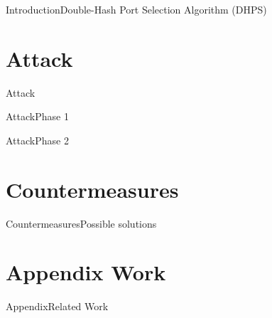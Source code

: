 \documentclass[aspectratio=169, hyperref={colorlinks=true, allcolors=SecondaryColor}, c]{beamer}
\begin{document}
\begin{frame}[fragile]{Introduction}{Double-Hash Port Selection Algorithm (DHPS)}
	\begin{center}
		\begin{adjustbox}{scale=0.7}
			
		\end{adjustbox}
	\end{center}
\end{frame}

\section{Attack}

\begin{frame}[fragile]{Attack}{}
\end{frame}

\begin{frame}[fragile]{Attack}{Phase 1}
	\begin{center}
		\begin{adjustbox}{scale=0.7}
			
		\end{adjustbox}
	\end{center}
\end{frame}

\begin{frame}[fragile]{Attack}{Phase 2}
	\begin{center}
		\begin{adjustbox}{scale=0.7}
			
		\end{adjustbox}
	\end{center}
\end{frame}

\section{Countermeasures}

\begin{frame}[fragile]{Countermeasures}{Possible solutions}
\end{frame}

\section{Appendix Work}

\begin{frame}[fragile]{Appendix}{Related Work}
\end{frame}
\end{document}
